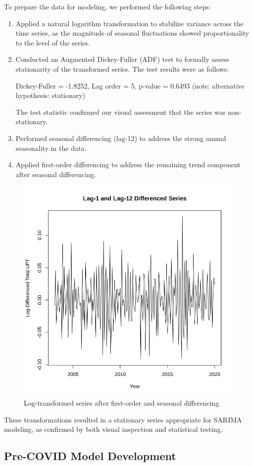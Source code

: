 \documentclass[11pt]{article}
\begin{document}
To prepare the data for modeling, we performed the following steps:

\begin{enumerate}
  \item Applied a natural logarithm transformation to stabilize variance across the time series, as the magnitude of seasonal fluctuations showed proportionality to the level of the series.
  
  \item Conducted an Augmented Dickey-Fuller (ADF) test to formally assess stationarity of the transformed series. The test results were as follows:
  
  Dickey-Fuller = -1.8252, Lag order = 5, p-value = 0.6493 (note: alternative hypothesis: stationary)
  
  The test statistic confirmed our visual assessment that the series was non-stationary.
  
  \item Performed seasonal differencing (lag-12) to address the strong annual seasonality in the data.
  
  \item Applied first-order differencing to address the remaining trend component after seasonal differencing.
\end{enumerate}

\begin{figure}[!ht]
\centering
\includegraphics[width=0.525\linewidth]{diff_series.png}
\caption{Log-transformed series after first-order and seasonal differencing}
\label{f:diff_series}
\end{figure}

These transformations resulted in a stationary series appropriate for SARIMA modeling, as confirmed by both visual inspection and statistical testing.

\subsection{Pre-COVID Model Development}
\end{document}
